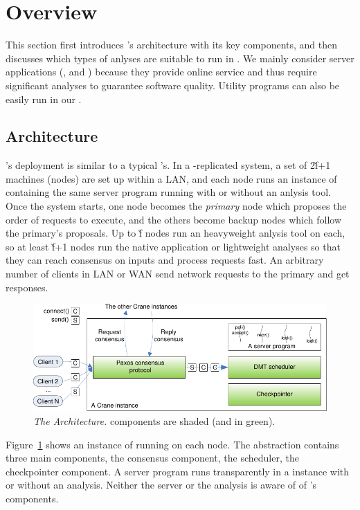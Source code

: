 \section{Overview} \label{sec:overview}

This section first introduces \xxx's architecture with its key components, and 
then discusses which types of anlyses are suitable to run in \xxx. We mainly 
consider server applications (\eg, \apache and \clamav) because they provide 
online service and thus require significant analyses to guarantee software 
quality. Utility programs can also be easily run in our \xxx.

\subsection{\xxx Architecture} \label{sec:arch}

\xxx's deployment is similar to a typical \smr's. In a \xxx-replicated
system, a set of 2\v{f}+1 machines (nodes) are set up within a LAN,
and each node runs an instance of \xxx containing the same server
program running with or without an anlysis tool. Once the \xxx system starts, 
one node becomes the \emph{primary} node which proposes the order of requests 
to execute, and the others become backup nodes which follow the primary's 
proposals. Up to \v{f} nodes run an heavyweight anlysis tool on each, so at 
least \v{f}+1 nodes run the native application or lightweight analyses so that 
they can reach consensus on inputs and process requests fast. An arbitrary 
number of clients in LAN or WAN send network requests to the primary and get 
responses. 


\begin{figure}[t]
\vspace{.20in}
\centering
\includegraphics[width=.5\textwidth]{figures/arch}
\vspace{-.20in}
\caption{{\em The \xxx Architecture.} \xxx components are shaded (and in
  green).} \label{fig:arch}
\vspace{-.05in}
\end{figure}

Figure~\ref{fig:arch} shows an instance of \xxx running on 
each node. The abstraction contains three main components, the \paxos consensus 
component, the \dmt scheduler, the checkpointer component. A server program 
runs transparently in a \xxx instance with or without an analysis. Neither the 
server or the analysis is aware of of \xxx's components.

